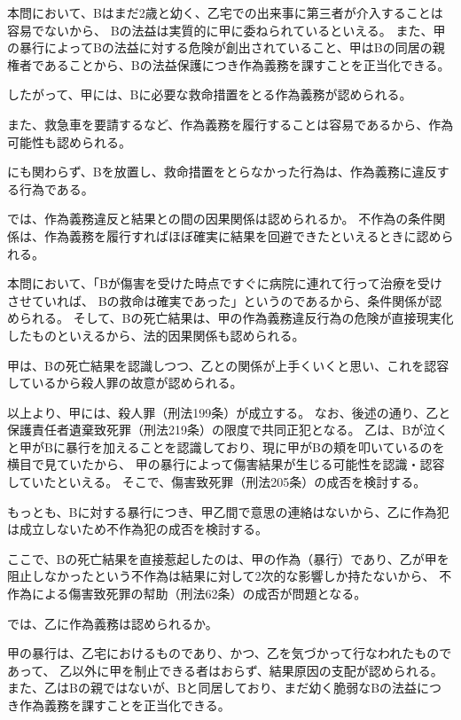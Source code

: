 \documentclass[11pt]{jsarticle}
\begin{document}
		本問において、Bはまだ2歳と幼く、乙宅での出来事に第三者が介入することは容易でないから、
		Bの法益は実質的に甲に委ねられているといえる。
		また、甲の暴行によってBの法益に対する危険が創出されていること、甲はBの同居の親権者であることから、Bの法益保護につき作為義務を課すことを正当化できる。
		
		したがって、甲には、Bに必要な救命措置をとる作為義務が認められる。
		
		また、救急車を要請するなど、作為義務を履行することは容易であるから、作為可能性も認められる。
		
		にも関わらず、Bを放置し、救命措置をとらなかった行為は、作為義務に違反する行為である。
		
		\sectionC{}
		では、作為義務違反と結果との間の因果関係は認められるか。
		不作為の条件関係は、作為義務を履行すればほぼ確実に結果を回避できたといえるときに認められる。
		
		\sectionC{}
		本問において、「Bが傷害を受けた時点ですぐに病院に連れて行って治療を受けさせていれば、
		Bの救命は確実であった」というのであるから、条件関係が認められる。
		そして、Bの死亡結果は、甲の作為義務違反行為の危険が直接現実化したものといえるから、法的因果関係も認められる。
		
		\sectionC{}
		甲は、Bの死亡結果を認識しつつ、乙との関係が上手くいくと思い、これを認容しているから殺人罪の故意が認められる。
		
		以上より、甲には、殺人罪（刑法199条）が成立する。
		なお、後述の通り、乙と保護責任者遺棄致死罪（刑法219条）の限度で共同正犯となる。
		\sectionC{}
		乙は、Bが泣くと甲がBに暴行を加えることを認識しており、現に甲がBの頬を叩いているのを横目で見ていたから、
		甲の暴行によって傷害結果が生じる可能性を認識・認容していたといえる。
		そこで、傷害致死罪（刑法205条）の成否を検討する。
		
		もっとも、Bに対する暴行につき、甲乙間で意思の連絡はないから、乙に作為犯は成立しないため不作為犯の成否を検討する。
		
		\sectionC{}
		ここで、Bの死亡結果を直接惹起したのは、甲の作為（暴行）であり、乙が甲を阻止しなかったという不作為は結果に対して2次的な影響しか持たないから、
		不作為による傷害致死罪の幇助（刑法62条）の成否が問題となる。
		
		では、乙に作為義務は認められるか。
		
		甲の暴行は、乙宅におけるものであり、かつ、乙を気づかって行なわれたものであって、
		乙以外に甲を制止できる者はおらず、結果原因の支配が認められる。
		また、乙はBの親ではないが、Bと同居しており、まだ幼く脆弱なBの法益につき作為義務を課すことを正当化できる。
\end{document}
